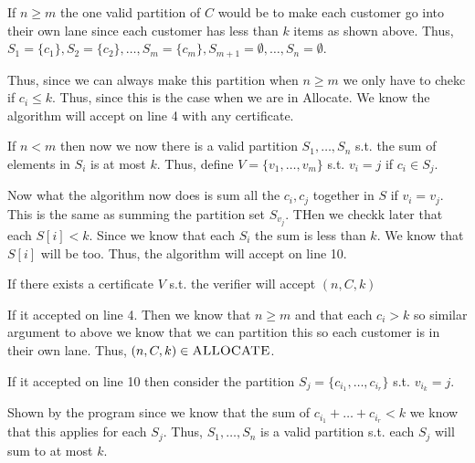 \documentclass[12pt, letterpaper]{article}
\begin{document}
\begin{problemproof}
        If $n \geq m$ the one valid partition of $C$ would be to make each customer go into their own lane since each customer has less than $k$ items as shown above. Thus, $S_1=\{c_1\}, S_2=\{c_2\},\dots, S_m=\{c_m\}, S_{m+1}=\emptyset,\dots,S_n=\emptyset$.

        Thus, since we can always make this partition when $n \geq m$ we only have to chekc if $c_i \leq k$. Thus, since this is the case when we are in Allocate. We know the algorithm will accept on line 4 with any certificate.

        If $n < m$ then now we now there is a valid partition $S_1,\dots,S_n$ s.t. the sum of elements in $S_i$ is at most $k$. Thus, define $V=\{v_1,\dots,v_m\}$ s.t. $v_i = j$ if $c_i \in S_j$.

        Now what the algorithm now does is sum all the $c_i,c_j$ together in $S$ if $v_i=v_j$. This is the same as summing the partition set $S_{v_j}$. THen we checkk later that each $S[i] < k$. Since we know that each $S_i$ the sum is less than $k$. We know that $S[i]$ will be too. Thus, the algorithm will accept on line 10.

        If there exists a certificate $V$ s.t. the verifier will accept $(n,C,k)$

        If it accepted on line 4. Then we know that $n \geq m$ and that each $c_i > k$ so similar argument to above we know that we can partition this so each customer is in their own lane. Thus, $(n,C,k) \in \textsc{ALLOCATE}$.

        If it accepted on line 10 then consider the partition $S_j=\{c_{i_1},\dots,c_{i_r}\}$ s.t. $v_{i_k}=j$.

        Shown by the program since we know that the sum of $c_{i_1}+\dots+c_{i_r} < k$ we know that this applies for each $S_j$. Thus, $S_1,\dots,S_n$ is a valid partition s.t. each $S_j$ will sum to at most $k$.
\end{problemproof}
\end{document}
